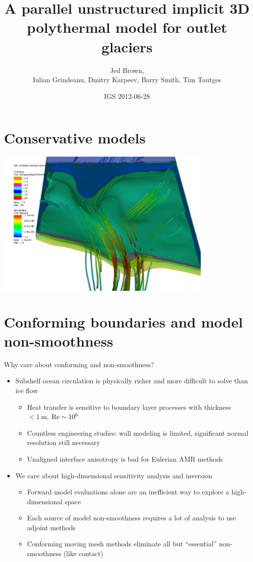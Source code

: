 \documentclass{beamer}
\title{A parallel unstructured implicit 3D polythermal model for outlet glaciers}
\author{Jed Brown,\\
Iulian Grindeanu, Dmitry Karpeev, Barry Smith, Tim Tautges}
\institute
{
  Mathematics and Computer Science Division, Argonne National Laboratory
}
\date{IGS 2012-06-28}
\begin{document}
\lstset{language=C}
\normalem

\begin{frame}
  \titlepage
\end{frame}

\section{Conservative models}

\begin{frame}
  \includegraphics[width=0.8\textwidth]{figures/VHT/VHTJakoContourStream}
\end{frame}



\section{Conforming boundaries and model non-smoothness}
\begin{frame}{Why care about conforming and non-smoothness?}
  \begin{itemize}
  \item Subshelf ocean circulation is physically richer and more difficult to solve than ice flow
    \begin{itemize}
    \item Heat transfer is sensitive to boundary layer processes with thickness $< \SI{1}{\metre}$, ${\mathrm{Re}} \sim 10^6$
    \item Countless engineering studies: wall modeling is limited, significant normal resolution still necessary
    \item Unaligned interface anisotropy is bad for Eulerian AMR methods
    \end{itemize}
  \item We care about high-dimensional sensitivity analysis and inversion
    \begin{itemize}
    \item Forward model evaluations alone are an inefficient way to explore a high-dimensional space
    \item Each source of model non-smoothness requires a lot of analysis to use adjoint methods
    \item Conforming moving mesh methods eliminate all but ``essential'' non-smoothness (like contact)
    \end{itemize}
  \end{itemize}
\end{frame}
\end{document}
